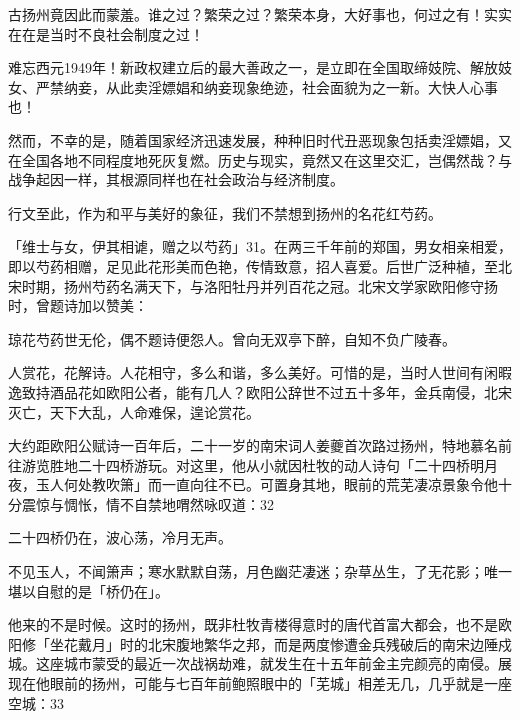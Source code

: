 古扬州竟因此而蒙羞。谁之过？繁荣之过？繁荣本身，大好事也，何过之有！实实在在是当时不良社会制度之过！

难忘西元1949年！新政权建立后的最大善政之一，是立即在全国取缔妓院、解放妓女、严禁纳妾，从此卖淫嫖娼和纳妾现象绝迹，社会面貌为之一新。大快人心事也！

然而，不幸的是，随着国家经济迅速发展，种种旧时代丑恶现象包括卖淫嫖娼，又在全国各地不同程度地死灰复燃。历史与现实，竟然又在这里交汇，岂偶然哉？与战争起因一样，其根源同样也在社会政治与经济制度。

\vfill
\begin{BookNotes}
\end{BookNotes}


行文至此，作为和平与美好的象征，我们不禁想到扬州的名花红芍药。

「维士与女，伊其相谑，赠之以芍药」31。在两三千年前的郑国，男女相亲相爱，即以芍药相赠，足见此花形美而色艳，传情致意，招人喜爱。后世广泛种植，至北宋时期，扬州芍药名满天下，与洛阳牡丹并列百花之冠。北宋文学家欧阳修守扬时，曾题诗加以赞美：

\begin{BookQuote}
琼花芍药世无伦，偶不题诗便怨人。曾向无双亭下醉，自知不负广陵春。
\end{BookQuote}

人赏花，花解诗。人花相守，多么和谐，多么美好。可惜的是，当时人世间有闲暇逸致持酒品花如欧阳公者，能有几人？欧阳公辞世不过五十多年，金兵南侵，北宋灭亡，天下大乱，人命难保，遑论赏花。

大约距欧阳公赋诗一百年后，二十一岁的南宋词人姜夔首次路过扬州，特地慕名前往游览胜地二十四桥游玩。对这里，他从小就因杜牧的动人诗句「二十四桥明月夜，玉人何处教吹箫」而一直向往不已。可置身其地，眼前的荒芜凄凉景象令他十分震惊与惆怅，情不自禁地喟然咏叹道：32

\begin{BookQuote}
二十四桥仍在，波心荡，冷月无声。
\end{BookQuote}

不见玉人，不闻箫声；寒水默默自荡，月色幽茫凄迷；杂草丛生，了无花影；唯一堪以自慰的是「桥仍在」。

他来的不是时候。这时的扬州，既非杜牧青楼得意时的唐代首富大都会，也不是欧阳修「坐花戴月」时的北宋腹地繁华之邦，而是两度惨遭金兵残破后的南宋边陲戍城。这座城市蒙受的最近一次战祸劫难，就发生在十五年前金主完颜亮的南侵。展现在他眼前的扬州，可能与七百年前鲍照眼中的「芜城」相差无几，几乎就是一座空城：33

